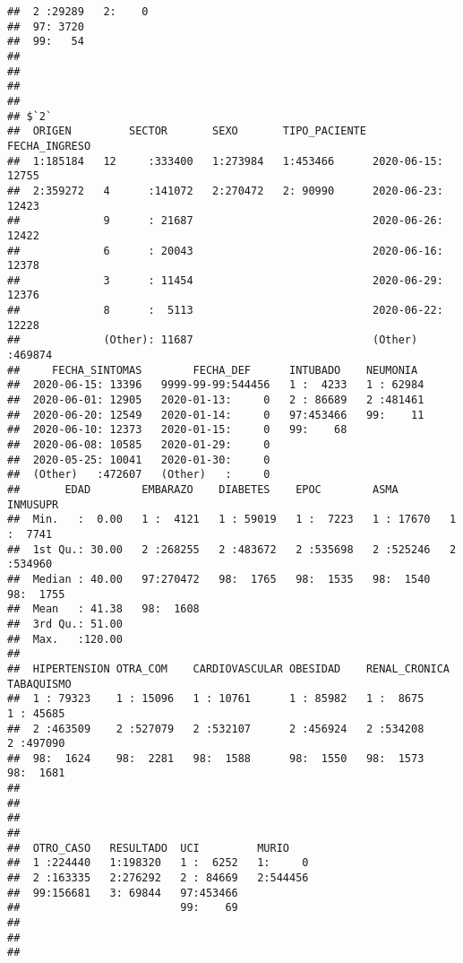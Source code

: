 \documentclass[]{article}
\begin{document}
\begin{verbatim}
##  2 :29289   2:    0  
##  97: 3720            
##  99:   54            
##                      
##                      
##                      
## 
## $`2`
##  ORIGEN         SECTOR       SEXO       TIPO_PACIENTE    FECHA_INGRESO   
##  1:185184   12     :333400   1:273984   1:453466      2020-06-15: 12755  
##  2:359272   4      :141072   2:270472   2: 90990      2020-06-23: 12423  
##             9      : 21687                            2020-06-26: 12422  
##             6      : 20043                            2020-06-16: 12378  
##             3      : 11454                            2020-06-29: 12376  
##             8      :  5113                            2020-06-22: 12228  
##             (Other): 11687                            (Other)   :469874  
##     FECHA_SINTOMAS        FECHA_DEF      INTUBADO    NEUMONIA   
##  2020-06-15: 13396   9999-99-99:544456   1 :  4233   1 : 62984  
##  2020-06-01: 12905   2020-01-13:     0   2 : 86689   2 :481461  
##  2020-06-20: 12549   2020-01-14:     0   97:453466   99:    11  
##  2020-06-10: 12373   2020-01-15:     0   99:    68              
##  2020-06-08: 10585   2020-01-29:     0                          
##  2020-05-25: 10041   2020-01-30:     0                          
##  (Other)   :472607   (Other)   :     0                          
##       EDAD        EMBARAZO    DIABETES    EPOC        ASMA        INMUSUPR   
##  Min.   :  0.00   1 :  4121   1 : 59019   1 :  7223   1 : 17670   1 :  7741  
##  1st Qu.: 30.00   2 :268255   2 :483672   2 :535698   2 :525246   2 :534960  
##  Median : 40.00   97:270472   98:  1765   98:  1535   98:  1540   98:  1755  
##  Mean   : 41.38   98:  1608                                                  
##  3rd Qu.: 51.00                                                              
##  Max.   :120.00                                                              
##                                                                              
##  HIPERTENSION OTRA_COM    CARDIOVASCULAR OBESIDAD    RENAL_CRONICA TABAQUISMO 
##  1 : 79323    1 : 15096   1 : 10761      1 : 85982   1 :  8675     1 : 45685  
##  2 :463509    2 :527079   2 :532107      2 :456924   2 :534208     2 :497090  
##  98:  1624    98:  2281   98:  1588      98:  1550   98:  1573     98:  1681  
##                                                                               
##                                                                               
##                                                                               
##                                                                               
##  OTRO_CASO   RESULTADO  UCI         MURIO     
##  1 :224440   1:198320   1 :  6252   1:     0  
##  2 :163335   2:276292   2 : 84669   2:544456  
##  99:156681   3: 69844   97:453466             
##                         99:    69             
##                                               
##                                               
## 
\end{verbatim}
\end{document}
